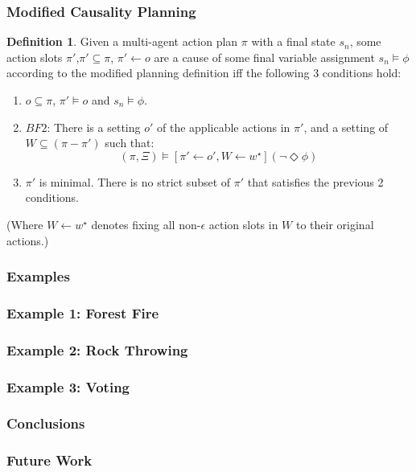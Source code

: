 \documentclass{beamer}
\theoremstyle{plain}
\theoremstyle{definition}
\newtheorem{defn}[thm]{Definition} %
\begin{document}
\begin{frame}
\frametitle{Modified Causality Planning}
\begin{defn}
Given a multi-agent action plan $\pi$ with a final state $s_n$, some action slots $\pi'$,$\pi' \subseteq \pi$, $\pi' \leftarrow o$ are a cause of some final variable assignment $s_n \models \phi$ according to the modified planning definition iff the following 3 conditions hold:
\begin{enumerate}
\item  $o \subseteq \pi$, $\pi' \models o$ and $s_n \models \phi$.
\item $BF2$: There is a setting $o'$ of the applicable actions in $\pi'$, and a setting of $W \subseteq (\pi  - \pi')$ such that:
\[
(\pi, \Xi) \models [\pi' \leftarrow o', W \leftarrow w^\star](\lnot \Diamond \phi)
\]
\item $\pi'$ is minimal. There is no strict subset of $\pi'$ that satisfies the previous 2 conditions.
\end{enumerate}


(Where $W\leftarrow w^\star$ denotes fixing all non-$\epsilon$ action slots in $W$ to their original actions.)

\end{defn}

\end{frame}

\begin{frame}
\frametitle{Examples}

\end{frame}


\begin{frame}
\frametitle{Example 1: Forest Fire}

\end{frame}


\begin{frame}
\frametitle{Example 2: Rock Throwing}

\end{frame}

\begin{frame}
\frametitle{Example 3: Voting}

\end{frame}


\begin{frame}
\frametitle{Conclusions}

\end{frame}


\begin{frame}
\frametitle{Future Work}

\end{frame}
\end{document}
